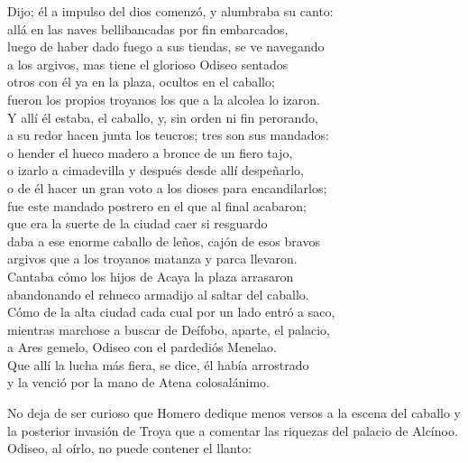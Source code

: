 \begin{versocita}
Dijo; él a impulso del dios comenzó, y alumbraba su canto:\\
allá en las naves bellibancadas por fin embarcados,\\
luego de haber dado fuego a sus tiendas, se ve navegando\\
a los argivos, mas tiene el glorioso Odiseo sentados\\
otros con él ya en la plaza, ocultos en el caballo;\\
fueron los propios troyanos los que a la alcolea lo izaron.\\
Y allí él estaba, el caballo, y, sin orden ni fin perorando,\\
a su redor hacen junta los teucros; tres son sus mandados:\\
o hender el hueco madero a bronce de un fiero tajo,\\
o izarlo a cimadevilla y después desde allí despeñarlo,\\
o de él hacer un gran voto a los dioses para encandilarlos;\\
fue este mandado postrero en el que al final acabaron;\\
que era la suerte de la ciudad caer si resguardo\\
daba a ese enorme caballo de leños, cajón de esos bravos\\
argivos que a los troyanos matanza y parca llevaron.\\
Cantaba cómo los hijos de Acaya la plaza arrasaron\\
abandonando el rehueco armadijo al saltar del caballo.\\
Cómo de la alta ciudad cada cual por un lado entró a saco,\\
mientras marchose a buscar de Deífobo, aparte, el palacio,\\
a Ares gemelo, Odiseo con el pardediós Menelao.\\
Que allí la lucha más fiera, se dice, él había arrostrado\\
y la venció por la mano de Atena colosalánimo.
\end{versocita}

No deja de ser curioso que Homero dedique menos versos a la escena del caballo y la posterior invasión de Troya que a comentar las riquezas del palacio de Alcínoo. Odiseo, al oírlo, no puede contener el llanto:


